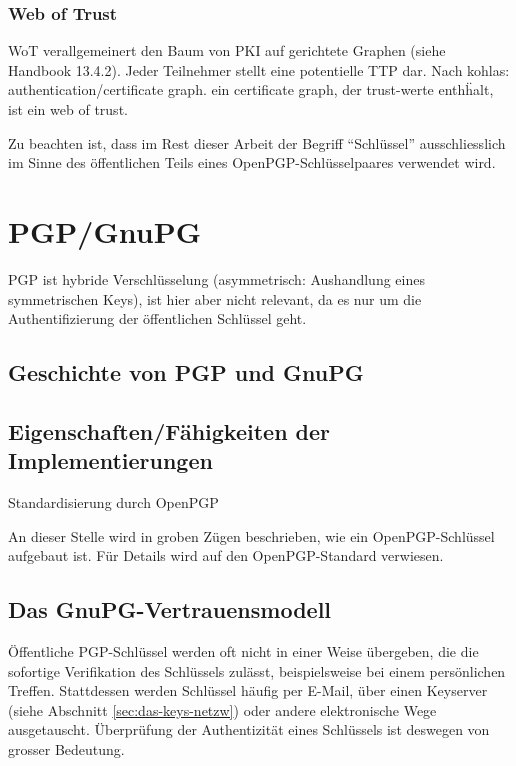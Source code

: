 \subsubsection{Web of Trust}
\label{ch:Grundlagen:sec:PublicKeyCrypto:subsec:KeyAuth:subsubsec:WOT}

WoT verallgemeinert den Baum von PKI auf gerichtete Graphen (siehe
Handbook 13.4.2). Jeder Teilnehmer stellt eine potentielle TTP dar.
Nach kohlas: authentication/certificate graph. ein certificate graph,
der trust-werte enth\"halt, ist ein web of trust.

Zu beachten ist, dass im Rest dieser Arbeit der Begriff
``Schl\"ussel'' ausschliesslich im Sinne des \"offentlichen Teils
eines OpenPGP-Schl\"usselpaares verwendet wird.

\section{PGP/GnuPG}
\label{ch:Grundlagen:sec:PGP}

PGP ist hybride Verschl\"usselung (asymmetrisch: Aushandlung eines
symmetrischen Keys), ist hier aber nicht relevant, da es nur um die
Authentifizierung der \"offentlichen Schl\"ussel geht.


\cite{wiki:pgp}

\subsection{Geschichte von PGP und GnuPG}
\label{ch:Grundlagen:sec:PGP:subsec:Geschichte}

\subsection{Eigenschaften/Fähigkeiten der Implementierungen}
\label{ch:Grundlagen:sec:PGP:subsec:Eigenschaften}

Standardisierung durch OpenPGP \cite{Callas1998} \cite{Callas2007}

An dieser Stelle wird in groben Z\"ugen beschrieben, wie ein
OpenPGP-Schl\"ussel aufgebaut ist. F\"ur Details wird auf den
OpenPGP-Standard\cite{Callas2007} verwiesen.


\subsection{Das GnuPG-Vertrauensmodell}
\label{sec:das-gnupg-vertrauensmodell}

Öffentliche PGP-Schlüssel werden oft nicht in einer Weise übergeben,
die die sofortige Verifikation des Schlüssels zulässt, beispielsweise
bei einem persönlichen Treffen. Stattdessen werden Schlüssel häufig
per E-Mail, über einen Keyserver (siehe Abschnitt
\ref{sec:das-keys-netzw}) oder andere elektronische Wege ausgetauscht.
Überprüfung der Authentizität eines Schlüssels ist deswegen von
grosser Bedeutung.

